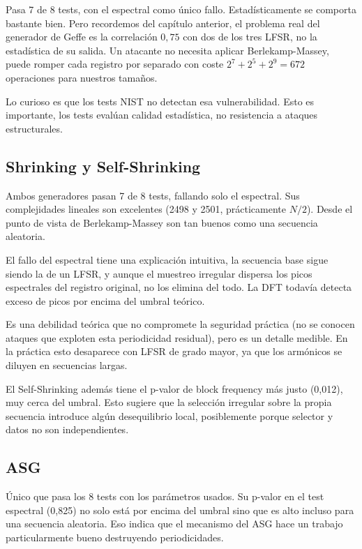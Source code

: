 Pasa 7 de 8 tests, con el espectral como único fallo. Estadísticamente se comporta bastante bien.
Pero recordemos del capítulo anterior, el problema real del generador de Geffe es la correlación $0{,}75$ con dos de los tres LFSR,
no la estadística de su salida. Un atacante no necesita aplicar Berlekamp-Massey,
puede romper cada registro por separado con coste $2^7 + 2^5 + 2^9 = 672$ operaciones para nuestros tamaños.

Lo curioso es que los tests NIST no detectan esa vulnerabilidad. Esto es importante, los tests evalúan calidad estadística,
no resistencia a ataques estructurales.

\subsection{Shrinking y Self-Shrinking}

Ambos generadores pasan 7 de 8 tests, fallando solo el espectral. Sus complejidades lineales son excelentes (2498 y 2501, prácticamente $N/2$).
Desde el punto de vista de Berlekamp-Massey son tan buenos como una secuencia aleatoria.

El fallo del espectral tiene una explicación intuitiva, la secuencia base sigue siendo la de un LFSR,
y aunque el muestreo irregular dispersa los picos espectrales del registro original,
no los elimina del todo. La DFT todavía detecta exceso de picos por encima del umbral teórico.

Es una debilidad teórica que no compromete la seguridad práctica (no se conocen ataques que exploten esta periodicidad residual),
pero es un detalle medible. En la práctica esto desaparece con LFSR de grado mayor, ya que los armónicos se diluyen en secuencias largas.

El Self-Shrinking además tiene el p-valor de block frequency más justo (0,012), muy cerca del umbral.
Esto sugiere que la selección irregular sobre la propia secuencia introduce algún desequilibrio local,
posiblemente porque selector y datos no son independientes.

\subsection{ASG}

Único que pasa los 8 tests con los parámetros usados. Su p-valor en el test espectral (0,825) no solo está por encima del umbral
sino que es alto incluso para una secuencia aleatoria. Eso indica que el mecanismo del ASG hace un trabajo particularmente bueno destruyendo periodicidades.

